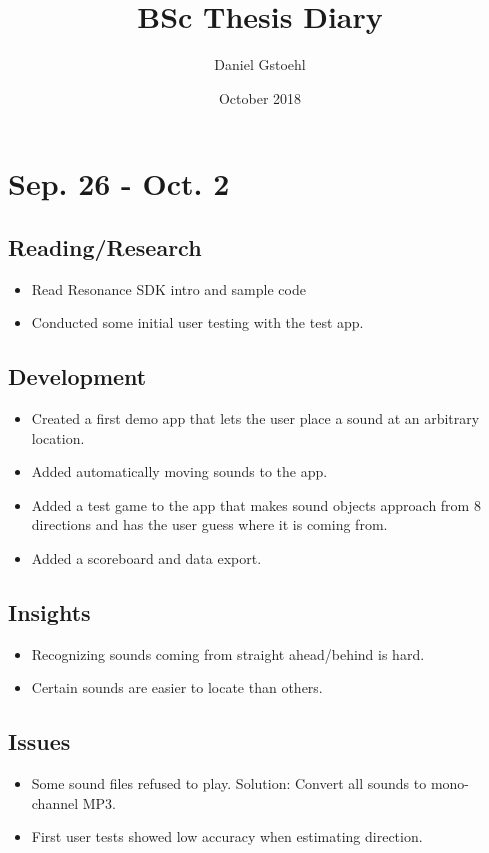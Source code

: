 \documentclass{article}
\title{BSc Thesis Diary}
\author{Daniel Gstoehl}
\date{October 2018}
\begin{document}
\maketitle
\tableofcontents
\newpage

\section{Sep. 26 - Oct. 2}
\subsection{Reading/Research}
\begin{itemize}
    \item Read Resonance SDK intro and sample code
    \item Conducted some initial user testing with the test app.
\end{itemize}
\subsection{Development}
\begin{itemize}
    \item Created a first demo app that lets the user place a sound at an arbitrary location.
    \item Added automatically moving sounds to the app.
    \item Added a test game to the app that makes sound objects approach from 8 directions and has the user guess where it is coming from.
    \item Added a scoreboard and data export.
\end{itemize}
\subsection{Insights}
\begin{itemize}
    \item Recognizing sounds coming from straight ahead/behind is hard.
    \item Certain sounds are easier to locate than others.
\end{itemize}
\subsection{Issues}
\begin{itemize}
    \item Some sound files refused to play. \newline Solution: Convert all sounds to mono-channel MP3. 
    \item First user tests showed low accuracy when estimating direction.
\end{itemize}
\end{document}

